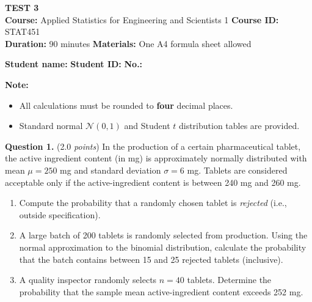 \documentclass[12pt]{article}
\begin{document}
\begin{center}
\textbf{\large TEST 3}\\[2pt]
\textbf{Course:} Applied Statistics for Engineering and Scientists 1 \quad
\textbf{Course ID:} STAT451\\[2pt]
\textbf{Duration:} 90 minutes \hspace{1.5cm} \textbf{Materials:} One A4 formula sheet allowed
\end{center}

\vspace{-6pt}
\noindent\textbf{Student name:} \dotfill \quad \textbf{Student ID:} \dotfill \quad \textbf{No.:} \dotfill

\vspace{4pt}
\noindent\textbf{Note:}
\begin{itemize}[leftmargin=*,topsep=2pt,itemsep=0pt]
  \item All calculations must be rounded to \textbf{four} decimal places.
  \item Standard normal $\mathcal{N}(0,1)$ and Student $t$ distribution tables are provided.
\end{itemize}

\textbf{Question 1.} (2.0 \emph{points})
In the production of a certain pharmaceutical tablet, the active
ingredient content (in mg) is approximately normally distributed with
mean $\mu = 250$ mg and standard deviation $\sigma = 6$ mg. Tablets
are considered acceptable only if the active-ingredient content is
between 240 mg and 260 mg.
\begin{enumerate}[label=(\alph*),leftmargin=*]
  \item Compute the probability that a randomly chosen tablet is
        \emph{rejected} (i.e., outside specification).
  \item A large batch of 200 tablets is randomly selected from
        production. Using the normal approximation to the binomial
        distribution, calculate the probability that the batch
        contains between 15 and 25 rejected tablets (inclusive).
  \item A quality inspector randomly selects $n = 40$ tablets.
        Determine the probability that the sample mean
        active-ingredient content exceeds 252 mg.
\end{enumerate}
\end{document}
